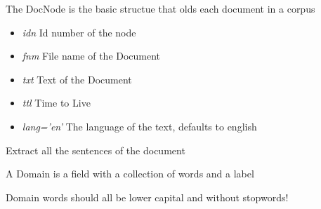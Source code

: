 \documentclass[letterpaper,10pt,english]{sphinxmanual}
\begin{document}

\begin{fulllineitems}
\label{theseus:theseus.processor.theseus.DocNode}
The DocNode is the basic structue that olds each document in a corpus
\begin{itemize}
\item {} 
\emph{idn} Id number of the node

\item {} 
\emph{fnm} File name of the Document

\item {} 
\emph{txt} Text of the Document

\item {} 
\emph{ttl} Time to Live

\item {} 
\emph{lang='en'} The language of the text, defaults to english

\end{itemize}

\begin{fulllineitems}
\label{theseus:theseus.processor.theseus.DocNode.extractSentences}
Extract all the sentences of the document

\end{fulllineitems}


\end{fulllineitems}


\begin{fulllineitems}
\label{theseus:theseus.processor.theseus.Domain}
A Domain is a field with a collection of words and a label

Domain words should all be lower capital and without stopwords!

\end{fulllineitems}

\end{document}
